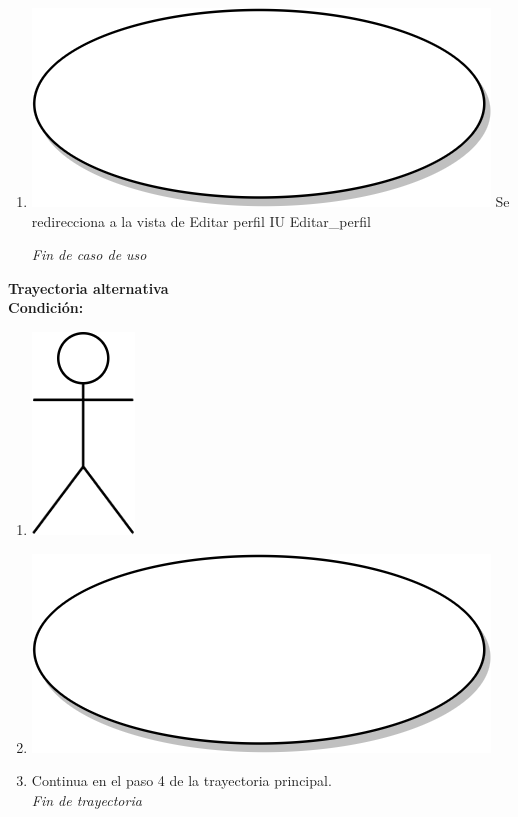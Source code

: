 \begin{enumerate}
\item {\includegraphics[scale=.05]{Capitulo3/img/proceso.png} Se redirecciona a la vista de Editar perfil IU Editar_perfil}

  \textit{Fin de caso de uso} \\  
\end{enumerate}

\textbf{Trayectoria alternativa} \label{cu3_2_ta_} \\
\textbf{Condición:} \\
 \begin{enumerate}[label=\arabic*]
    \item {\includegraphics[scale=.1]{Capitulo3/img/actor.png} }
    \item {\includegraphics[scale=.05]{Capitulo3/img/proceso.png}}
    \item {Continua en el paso 4 de la trayectoria principal.} \\
    \textit{Fin de trayectoria} \\
\end{enumerate}


